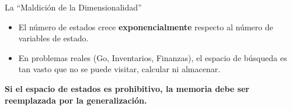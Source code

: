 \documentclass[xcolor=dvipsnames, handout]{beamer}
\begin{document}
\begin{frame}{La “Maldici\'on de la Dimensionalidad”}
\begin{itemize}
    \item  El n\'umero de estados crece \textbf{exponencialmente} respecto al n\'umero de variables de estado.
    \item En problemas reales (Go, Inventarios, Finanzas), el espacio de b\'usqueda es tan vasto que no se puede visitar, calcular ni almacenar.
\end{itemize}


 {\begin{center}\textbf{Si el espacio de estados es prohibitivo, la memoria debe ser reemplazada por la generalizaci\'on.}\end{center}}
\end{frame}
\end{document}
